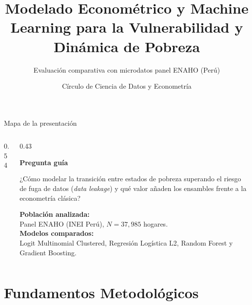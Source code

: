 \documentclass[aspectratio=169,11pt,table]{beamer}
\title{Modelado Econométrico y Machine Learning para la Vulnerabilidad y Dinámica de Pobreza}
\subtitle{Evaluación comparativa con microdatos panel ENAHO (Perú)}
\author{Círculo de Ciencia de Datos y Econometría}
\date{}
\begin{document}

\begin{frame}{Mapa de la presentación}
\begin{columns}[T,onlytextwidth]
\begin{column}{0.54\textwidth}
\small
\tableofcontents
\end{column}
\begin{column}{0.43\textwidth}
\begin{keybox}
\textbf{Pregunta guía}\par\vspace{0.10cm}
¿Cómo modelar la transición entre estados de pobreza superando el riesgo de fuga de datos (\textit{data leakage}) y qué valor añaden los ensambles frente a la econometría clásica?
\end{keybox}
\vspace{0.14cm}
\begin{ccdebox}
\small
\textbf{Población analizada:}\\
Panel ENAHO (INEI Perú), $N = 37{,}985$ hogares.\\[0.10cm]
\textbf{Modelos comparados:}\\
Logit Multinomial Clustered, Regresión Logística L2, Random Forest y Gradient Boosting.
\end{ccdebox}
\end{column}
\end{columns}
\end{frame}

\section{Fundamentos Metodológicos}
\end{document}

